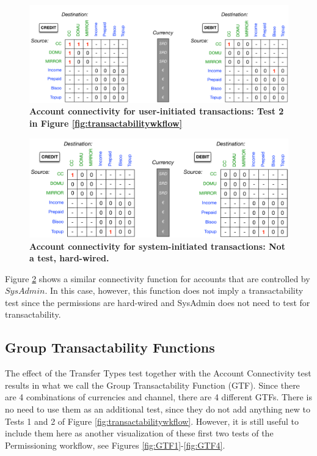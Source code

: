 \begin{figure}[h]
\centering
\includegraphics[width=17cm]{Figures/User_Acct_Connectivity}
\caption{\small\textbf{Account connectivity for user-initiated transactions: Test 2 in Figure \ref{fig:transactabilitywkflow}}}
\label{fig:User_Acct_Connectivity}
\end{figure}

\begin{figure}[H]
\centering
\includegraphics[width=17cm]{Figures/SysAdmin_Acct_Connectivity}
\caption{\small\textbf{Account connectivity for system-initiated transactions: Not a test, hard-wired. }}
\label{fig:SysAdmin_Acct_Connectivity}
\end{figure}

Figure \ref{fig:SysAdmin_Acct_Connectivity} shows a similar connectivity function for accounts that are controlled by $SysAdmin$. In this case, however, this function does not imply a transactability test since the permissions are hard-wired and SysAdmin does not need to test for transactability.

\subsection{Group Transactability Functions}
The effect of the Transfer Types test together with the Account Connectivity test results in what we call the Group Transactability Function (GTF). Since there are 4 combinations of currencies and channel, there are 4 different GTFs. There is no need to use them as an additional test, since they do not add anything new to Tests 1 and 2 of Figure \ref{fig:transactabilitywkflow}. However, it is still useful to include them here as another visualization of these first two tests of the Permissioning workflow, see Figures \ref{fig:GTF1}-\ref{fig:GTF4}.

